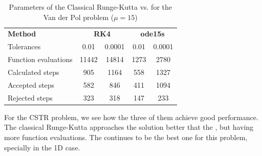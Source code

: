 \begin{table}[H]
    \centering
    \begin{tabular}{@{}l|cc|cc@{}}
    \toprule
    \textbf{Method}      & \multicolumn{2}{c|}{\textbf{RK4}} & \multicolumn{2}{c}{\textbf{ode15s}} \\
    Tolerances           & 0.01            & 0.0001          & 0.01            & 0.0001            \\ \midrule
    Function evaluations & 11442           & 14814           & 1273            & 2780              \\
    Calculated steps     & 905             & 1164            & 558             & 1327              \\
    Accepted steps       & 582             & 846             & 411             & 1094              \\
    Rejected steps       & 323             & 318             & 147             & 233               \\ \bottomrule
    \end{tabular}
    \caption{Parameters of the Classical Runge-Kutta vs.  for the Van der Pol problem ($\mathit{\mu = 15}$)}
    \label{6_6_adaptive_mu_15_table}
\end{table}

For the CSTR problem, we see how the three of them achieve good performance. The classical Runge-Kutta approaches the solution better that the , but having more function evaluations. The  continues to be the best one for this problem, specially in the 1D case.

